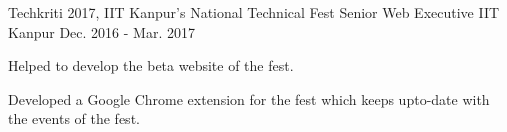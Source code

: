 

\begin{cventries}

  \cventry
    {Techkriti 2017, IIT Kanpur's National Technical Fest} %
    {Senior Web Executive} %
    {IIT Kanpur} %
    {Dec. 2016 - Mar. 2017} %
    {
      \begin{cvitems} %
      \item {Helped to develop the beta website of the fest.}
        \item {Developed a Google Chrome extension for the fest which keeps
            upto-date with the events of the fest.}
      \end{cvitems}
    }

\end{cventries}
